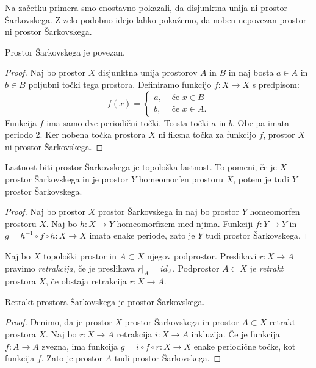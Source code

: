 \documentclass[mat2]{fmfdelo}
\begin{document}
Na začetku primera smo enostavno pokazali, da disjunktna unija ni prostor Šarkovskega. Z zelo podobno idejo lahko pokažemo, da noben nepovezan prostor ni prostor Šarkovskega.

\begin{trditev}
Prostor Šarkovskega je povezan.
\end{trditev}
\begin{proof}
Naj bo prostor $X$ disjunktna unija prostorov $A$ in $B$ in naj bosta $a \in A$ in $b \in B$ poljubni točki tega prostora. Definiramo funkcijo $f:X \to X$ s predpisom:
\[ f(x) = \begin{cases}
  a, & \mbox{ če $x \in B $}\\
  b ,& \mbox{ če $x \in A$.}
  \end{cases}
  \]
Funkcija $f$ ima samo dve periodični točki. To sta točki $a$ in $b$. Obe pa imata periodo 2. Ker nobena točka prostora $X$ ni fiksna točka za funkcijo $f$, prostor $X$ ni prostor Šarkovskega.
\end{proof}

\begin{trditev}
Lastnost biti prostor Šarkovskega je topološka lastnost. To pomeni, če je $X$ prostor Šarkovskega in je prostor $Y$ homeomorfen prostoru $X$, potem je tudi $Y$ prostor Šarkovskega.
\end{trditev}
\begin{proof}
Naj bo prostor $X$ prostor Šarkovskega in naj bo prostor $Y$ homeomorfen prostoru $X$. Naj bo $h : X \to Y$ homeomorfizem med njima. Funkciji $f : Y \to Y$ in $g = h^{-1} \circ f \circ h : X \to X$ imata enake periode, zato je $Y$ tudi prostor Šarkovskega.
\end{proof}

\begin{definicija}
Naj bo $X$ topološki prostor in $A \subset X$ njegov podprostor. Preslikavi $r : X \to A$ pravimo \emph{retrakcija}, če je preslikava $r|_A = id_A$. Podprostor $A \subset X$ je \emph{retrakt} prostora $X$, če obstaja retrakcija $r: X \to A$.
\end{definicija}

\begin{trditev}
Retrakt prostora Šarkovskega je prostor Šarkovskega.
\end{trditev}
\begin{proof}
Denimo, da je prostor $X$ prostor Šarkovskega in prostor $A \subset X$ retrakt prostora $X$. Naj bo $r : X \to A$ retrakcija $i : X \to A$ inkluzija. Če je funkcija $f : A \to A$ zvezna, ima funkcija $g = i \circ f \circ r : X \to X$ enake periodične točke, kot funkcija $f$. Zato je prostor $A$ tudi prostor Šarkovskega.
\end{proof}
\end{document}
